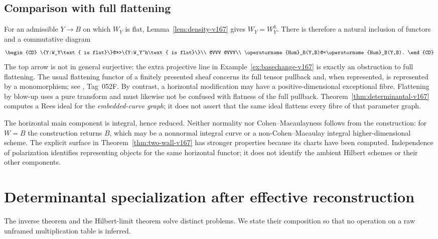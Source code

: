 \documentclass[11pt,reqno]{amsart}
\numberwithin{equation}{section}
\theoremstyle{definition}\newtheorem{definition}[theorem]{Definition}
\theoremstyle{remark}\newtheorem{remark}[theorem]{Remark}
\begin{document}
\subsection{Comparison with full flattening}
For an admissible $Y\to B$ on which $W_Y$ is flat,
Lemma~\ref{lem:density-v167} gives $W_Y=W_Y^h$. There is therefore
a natural inclusion of functors and a commutative diagram
\[
\begin{CD}
 \{Y:W_Y\text{ is flat}\}@>>>\{Y:W_Y^h\text{ is flat}\}\\
 @VVV @VVV\\
 \operatorname{Hom}_B(Y,B)@=\operatorname{Hom}_B(Y,B).
\end{CD}
\]
The top arrow is not in general surjective: the extra projective
line in Example~\ref{ex:basechange-v167} is exactly an obstruction
to full flattening. The usual flattening functor of a finitely
presented sheaf concerns its full tensor pullback and, when
represented, is represented by a monomorphism; see
\cite{Stacks166}, Tag~052F. By contrast, a horizontal modification
may have a positive-dimensional exceptional fibre. Flattening by
blow-up uses a pure transform and must likewise not be confused
with flatness of the full pullback. Theorem~\ref{thm:determinantal-v167}
computes a Rees ideal for the \emph{embedded-curve graph}; it does
not assert that the same ideal flattens every fibre of that
parameter graph.

The horizontal main component is integral, hence reduced. Neither
normality nor Cohen--Macaulayness follows from the construction:
for $W=B$ the construction returns $B$, which may be a nonnormal
integral curve or a non-Cohen--Macaulay integral higher-dimensional
scheme. The explicit surface in Theorem~\ref{thm:two-wall-v167}
has stronger properties because its charts have been computed.
Independence of polarization identifies representing objects for
the same horizontal functor; it does not identify the ambient
Hilbert schemes or their other components.

\section{Determinantal specialization after effective reconstruction}
\label{sec:effective-states-v167}
The inverse theorem and the Hilbert-limit theorem solve distinct
problems. We state their composition so that no operation on a
raw unframed multiplication table is inferred.
\end{document}
